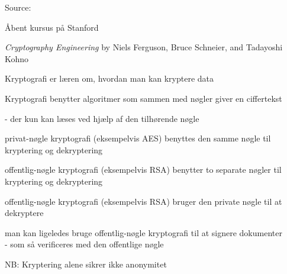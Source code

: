 \documentclass[Screen16to9,17pt]{foils}
\begin{document}
Source: 




Åbent kursus på Stanford\\



\emph{Cryptography Engineering} by
Niels Ferguson, Bruce Schneier, and Tadayoshi Kohno\\





\begin{list1}
\item Kryptografi er læren om, hvordan man kan kryptere data
\item Kryptografi benytter algoritmer som sammen med nøgler giver en
  ciffertekst
\item  - der kun kan læses ved hjælp af den tilhørende nøgle
\end{list1}



\begin{list1}
\item privat-nøgle kryptografi (eksempelvis AES) benyttes den samme
  nøgle til kryptering og dekryptering
\item offentlig-nøgle kryptografi (eksempelvis RSA) benytter to
  separate nøgler til kryptering og dekryptering
\end{list1}



\begin{list1}
\item offentlig-nøgle kryptografi (eksempelvis RSA) bruger den private
  nøgle til at dekryptere
\item man kan ligeledes bruge offentlig-nøgle kryptografi til at
  signere dokumenter\\ - som så verificeres med den offentlige nøgle
\item NB: Kryptering alene sikrer ikke anonymitet
\end{list1}
\end{document}
